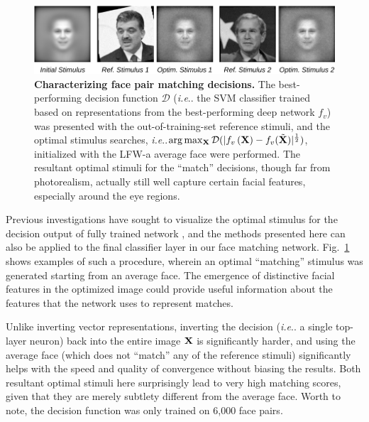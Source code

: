 \documentclass{article} %
\makeatletter
\DeclareRobustCommand\onedot{\futurelet\@let@token\@onedot}
\def\@onedot{\ifx\@let@token.\else.\null\fi\xspace}
\def\ie{\emph{i.e}\onedot} \def\Ie{\emph{I.e}\onedot}
\makeatother
\begin{document}
\begin{figure}[H]
\centering \includegraphics[width=\textwidth]{Figs/whole_face.pdf}
\caption{{\bf Characterizing face pair matching decisions.}
The best-performing decision function $\mathcal{D}$ (\ie the SVM classifier trained based on representations from the best-performing deep network $f_v$) {was} presented with the out-of-training-set reference stimuli, and the optimal stimulus searches, \ie $\arg\max_{\bf{X}}\mathcal{D}(| f_v\left({\bf{X}}\right) - f_v(\tilde{\bf{X}}) |^\frac{1}{2})$, initialized with the LFW-a average face {were} performed.
The resultant optimal stimuli for the ``match'' decisions, though far from photorealism, actually still well capture certain facial features, especially around the eye regions.
}
\label{fig:wface}
\end{figure}

Previous investigations have sought to visualize the optimal stimulus for the decision output of fully trained network \cite{zeiler2014visualizing, simonyan2013deep}, and the methods presented here can also be applied to the final classifier layer in our face matching network.  Fig.~\ref{fig:wface} shows examples of such a procedure, wherein an optimal ``matching'' stimulus was generated starting from an average face. The emergence of distinctive facial features in the optimized image could provide useful information about the features that the network uses to represent matches.

Unlike inverting vector representations, inverting the decision (\ie a single top-layer neuron) back into the entire image $\bf{X}$ is significantly harder, and using the average face (which does not ``match'' any of the reference stimuli) significantly helps with the speed and quality of convergence without biasing the results.
Both resultant optimal stimuli here surprisingly lead to very high matching scores, given that they are merely subtlety different from the average face.
Worth to note, the decision function {was} only trained on 6,000 face pairs.




{\small


}
\end{document}
